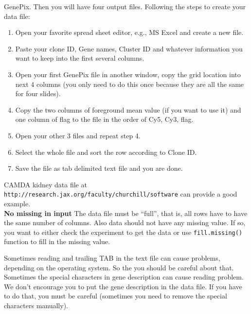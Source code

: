 GenePix. Then you will have four output files. Following the steps to create your data file:
\begin{enumerate}
\item Open your favorite spread sheet editor, e.g., MS Excel and 
create a new file.
\item Paste your clone ID, Gene names, Cluster ID and whatever
information you want to keep into the first several columns.
\item Open your first GenePix file in another window, 
copy the grid location into next 4 columns (you only need to do this once
because they are all the same for four slides).
\item Copy the two columns of foreground mean value (if you want to use it)
and one column of flag to the file in the order of Cy5, Cy3, flag.
\item Open your other 3 files and repeat step 4.
\item Select the whole file and sort the row according to Clone ID.
\item Save the file as tab delimited text file and you are done. 
\end{enumerate}
CAMDA kidney data file at {\tt
http://research.jax.org/faculty/churchill/software} can provide a good example.\\
{\bf No missing in input} The data file must be ``full'', that is, all rows
have to have the same number of columns. Also data should not have any missing
value. If so, you want to either check the experiment to get the data or
use {\tt fill.missing()} function to fill in the missing value. 

Sometimes reading and trailing TAB in the text file can cause
problems, depending on the operating system. So the you should be careful
about that. Sometimes the special characters in gene description can
cause reading problem. We don't encourage you to put the gene description
in the data file. If you have to do that, you must be careful (sometimes
you need to remove the special characters manually).
